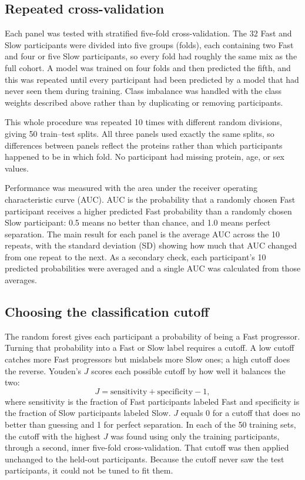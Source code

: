 \documentclass[11pt,letterpaper]{article}
\begin{document}
\subsection{Repeated cross-validation}

Each panel was tested with stratified five-fold cross-validation. The 32 Fast and Slow participants were divided into five groups (folds), each containing two Fast and four or five Slow participants, so every fold had roughly the same mix as the full cohort. A model was trained on four folds and then predicted the fifth, and this was repeated until every participant had been predicted by a model that had never seen them during training. Class imbalance was handled with the class weights described above rather than by duplicating or removing participants.

This whole procedure was repeated 10 times with different random divisions, giving 50 train--test splits. All three panels used exactly the same splits, so differences between panels reflect the proteins rather than which participants happened to be in which fold. No participant had missing protein, age, or sex values.

Performance was measured with the area under the receiver operating characteristic curve (AUC). AUC is the probability that a randomly chosen Fast participant receives a higher predicted Fast probability than a randomly chosen Slow participant: 0.5 means no better than chance, and 1.0 means perfect separation. The main result for each panel is the average AUC across the 10 repeats, with the standard deviation (SD) showing how much that AUC changed from one repeat to the next. As a secondary check, each participant's 10 predicted probabilities were averaged and a single AUC was calculated from those averages.

\subsection{Choosing the classification cutoff}

The random forest gives each participant a probability of being a Fast progressor. Turning that probability into a Fast or Slow label requires a cutoff. A low cutoff catches more Fast progressors but mislabels more Slow ones; a high cutoff does the reverse. Youden's $J$ scores each possible cutoff by how well it balances the two:
\[
J = \text{sensitivity} + \text{specificity} - 1,
\]
where sensitivity is the fraction of Fast participants labeled Fast and specificity is the fraction of Slow participants labeled Slow. $J$ equals 0 for a cutoff that does no better than guessing and 1 for perfect separation. In each of the 50 training sets, the cutoff with the highest $J$ was found using only the training participants, through a second, inner five-fold cross-validation. That cutoff was then applied unchanged to the held-out participants. Because the cutoff never saw the test participants, it could not be tuned to fit them.
\end{document}
